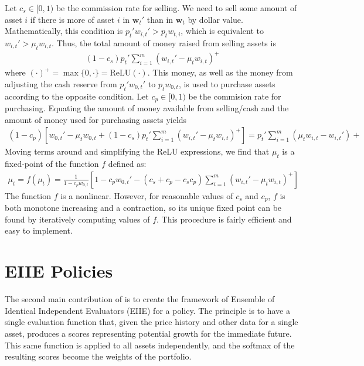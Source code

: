 Let $c_s \in [0, 1)$ be the commission rate for selling. We need to sell some amount of asset $i$ if 
there is more of asset $i$ in $\mathbf w_t'$ than in $\mathbf w_t$ by dollar value. Mathematically, this condition
is $p_t' w_{i,t}' > p_t w_{t,i}$, which is equivalent to $w_{i,t}' > \mu_t w_{i,t}$. Thus, the total amount of
money raised from selling assets is
\begin{align*}
  (1-c_s) p_t' \sum_{i=1}^m (w_{i,t}' - \mu_t w_{i,t})^+
\end{align*}
where $(\cdot)^+ = \max\{0, \cdot\} = \mathrm{ReLU}(\cdot)$. This money, as well as the money from adjusting the cash reserve
from $p_t' w_{0,t}'$ to $p_t w_{0,t}$, is used to purchase assets according to the opposite condition.
Let $c_p \in [0, 1)$ be the commision rate for purchasing. Equating the amount of money available from selling/cash and the amount of money
used for purchasing assets yields
\begin{align*}
  (1-c_p)\left[ w_{0,t}' - \mu_t w_{0,t} + (1-c_s) p_t' \sum_{i=1}^m (w_{i,t}' - \mu_t w_{i,t})^+ \right] = p_t'\sum_{i=1}^m (\mu_t w_{i,t} - w_{i,t}')+
\end{align*}
Moving terms around and simplifying the ReLU expressions, we find that $\mu_t$ is a fixed-point of the function $f$ defined as:
\begin{align*}
  \mu_t = f(\mu_t) = \frac{1}{1 - c_p w_{0,t}}\left[ 1 - c_p w_{0,t}' - (c_s + c_p - c_s c_p) \sum_{i=1}^m (w_{i,t}' - \mu_t w_{i,t})^+ \right]
\end{align*}
The function $f$ is a nonlinear. However, for reasonable values of $c_s$ and $c_p$, $f$ is both monotone increasing and a contraction, so its unique fixed point
can be found by iteratively computing values of $f$. This procedure is fairly efficient and easy to implement.



\section{EIIE Policies}
The second main contribution of \cite{drl_framework} is to create the framework of
Ensemble of Identical Independent Evaluators (EIIE) for a policy.
The principle is to have a single evaluation function that, given the price history and other data for a single asset,
produces a scores representing potential growth for the immediate future. This same function is
applied to all assets independently, and the softmax of the resulting scores become the weights of the portfolio.

